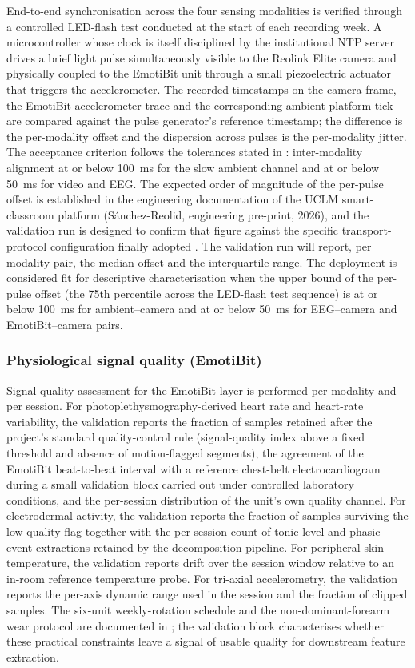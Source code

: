 End-to-end synchronisation across the four sensing modalities is verified through a controlled LED-flash test conducted at the start of each recording week. A microcontroller whose clock is itself disciplined by the institutional NTP server drives a brief light pulse simultaneously visible to the Reolink Elite camera and physically coupled to the EmotiBit unit through a small piezoelectric actuator that triggers the accelerometer. The recorded timestamps on the camera frame, the EmotiBit accelerometer trace and the corresponding ambient-platform tick are compared against the pulse generator's reference timestamp; the difference is the per-modality offset and the dispersion across pulses is the per-modality jitter. The acceptance criterion follows the tolerances stated in : inter-modality alignment at or below 100~ms for the slow ambient channel and at or below 50~ms for video and EEG. The expected order of magnitude of the per-pulse offset is established in the engineering documentation of the UCLM smart-classroom platform (Sánchez-Reolid, engineering pre-print, 2026), and the validation run is designed to confirm that figure against the specific transport-protocol configuration finally adopted \parencite{Mishra2020_mqtt,Shi2016_edge}. The validation run will report, per modality pair, the median offset and the interquartile range. The deployment is considered fit for descriptive characterisation when the upper bound of the per-pulse offset (the 75th percentile across the LED-flash test sequence) is at or below 100~ms for ambient--camera and at or below 50~ms for EEG--camera and EmotiBit--camera pairs.

\subsubsection{Physiological signal quality (EmotiBit)}\label{subsec:val-emotibit}

Signal-quality assessment for the EmotiBit layer is performed per modality and per session. For photoplethysmography-derived heart rate and heart-rate variability, the validation reports the fraction of samples retained after the project's standard quality-control rule (signal-quality index above a fixed threshold and absence of motion-flagged segments), the agreement of the EmotiBit beat-to-beat interval with a reference chest-belt electrocardiogram during a small validation block carried out under controlled laboratory conditions, and the per-session distribution of the unit's own quality channel. For electrodermal activity, the validation reports the fraction of samples surviving the low-quality flag together with the per-session count of tonic-level and phasic-event extractions retained by the decomposition pipeline. For peripheral skin temperature, the validation reports drift over the session window relative to an in-room reference temperature probe. For tri-axial accelerometry, the validation reports the per-axis dynamic range used in the session and the fraction of clipped samples. The six-unit weekly-rotation schedule and the non-dominant-forearm wear protocol are documented in ; the validation block characterises whether these practical constraints leave a signal of usable quality for downstream feature extraction.

